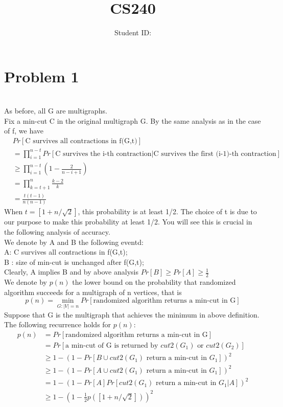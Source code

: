 \documentclass{article}
\title{CS240 \exerciseset}
\author{\studentname \qquad Student ID: \suid}
\begin{document}
\maketitle

\section*{Problem 1}
\quad\\
As before, all G are multigraphs.\\
Fix a min-cut C in the original multigraph G. By the same analysis as in the case of f, we have\\
	\begin{equation}
	\begin{aligned}
	&Pr[\text{C survives all contractions in f(G,t)}] \\
	&=\prod_{i=1}^{n-t}Pr[\text{C survives the i-th contraction}| \text{C survives the first (i-1)-th contraction}]\\
	&\ge \prod_{i=1}^{n-t}(1 - \frac{2}{n-i+1})            \\
	& = \prod_{k =t+1}^{n} \frac{k-2}{k}\\
	&= \frac{t(t-1)}{n(n-1)}\nonumber
	\end{aligned}
	\end{equation}
When $t = [1+n/\sqrt{2}]$, this probability is at least 1/2. The choice of t is due to our purpose to make this probability at least 1/2. You will see this is crucial in the following analysis of accuracy.\\
We denote by A and B the following eventd:\\
A: C survives all contractions in f(G,t);\\
B : size of min-cut is unchanged after  f(G,t);\\
Clearly,  A implies B and by above analysis $Pr[B] \ge Pr[A] \ge  \frac{1}{2}$\\
We denote by $p(n)$ the lower bound on the probability that randomized algorithm succeeds for a multigraph of n 
vertices, that is \\
$$ p(n) = \min\limits_{G:|V|=n}Pr[\text{randomized algorithm returns a min-cut in G}] $$
Suppose that G is the multigraph that achieves the minimum in above definition. The following recurrence holds for $p(n)$:\\
	\begin{equation}
	\begin{aligned}	
	p(n)&=Pr[\text{randomized algorithm returns a min-cut in G}]\\
	      &= Pr[\text{a min-cut of G is returned by }  cut2(G_1) \text{ or } cut2(G_2)]\\
	      &\ge 1- (1- Pr[B\cup  cut2(G_1) \text{ return a min-cut in } G_1])^2\\
	      &\ge 1- (1- Pr[A\cup  cut2(G_1) \text{ return a min-cut in } G_1])^2\\
	      & = 1- (1- Pr[A]Pr[ cut2(G_1) \text{ return a min-cut in } G_1|A])^2\\
	      & \ge 1 - (1- \frac{1}{2}p([1+n/\sqrt{2}]))^2\nonumber
	\end{aligned}
	\end{equation}
\end{document}
